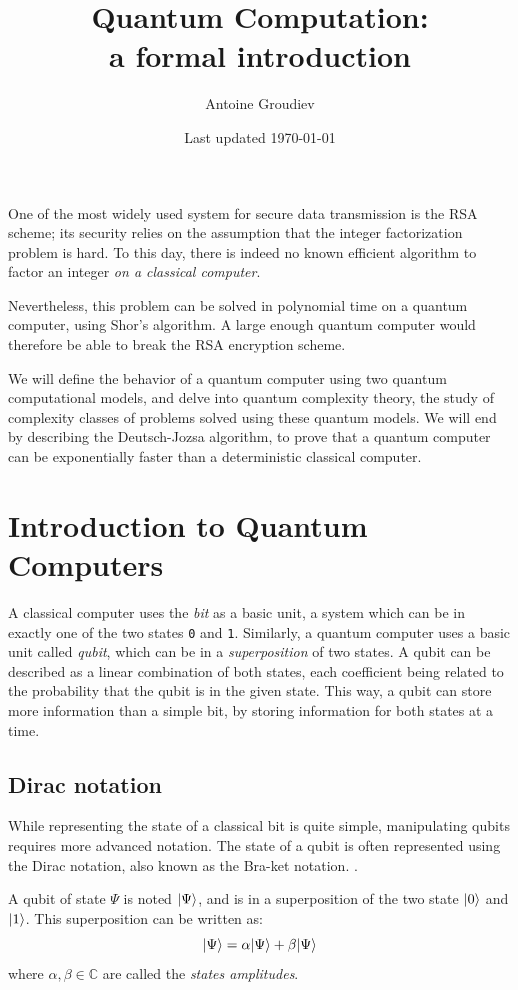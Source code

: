 \documentclass[12pt,a4paper]{article}
\title{\vspace{-5ex} \textbf{Quantum Computation:\\a formal introduction}}
\author{Antoine Groudiev}
\date{\vspace{-1ex}Last updated \today}
\theoremstyle{plain}
\theoremstyle{definition}
\DeclarePairedDelimiter\ket{\lvert}{\rangle}
\begin{document}
\maketitle
One of the most widely used system for secure data transmission is the RSA scheme; its security relies on the assumption that the integer factorization problem is hard. To this day, there is indeed no known efficient algorithm to factor an integer \textit{on a classical computer}.

Nevertheless, this problem can be solved in polynomial time on a quantum computer, using Shor's algorithm. A large enough quantum computer would therefore be able to break the RSA encryption scheme.

We will define the behavior of a quantum computer using two quantum computational models, and delve into quantum complexity theory, the study of complexity classes of problems solved using these quantum models. We will end by describing the Deutsch-Jozsa algorithm, to prove that a quantum computer can be exponentially faster than a deterministic classical computer.

\tableofcontents

\section{Introduction to Quantum Computers}
A classical computer uses the \emph{bit} as a basic unit, a system which can be in exactly one of the two states \texttt{0} and \texttt{1}. Similarly, a quantum computer uses a basic unit called \emph{qubit}, which can be in a \emph{superposition} of two states. A qubit can be described as a linear combination of both states, each coefficient being related to the probability that the qubit is in the given state. This way, a qubit can store more information than a simple bit, by storing information for both states at a time.

\subsection{Dirac notation}
While representing the state of a classical bit is quite simple, manipulating qubits requires more advanced notation. 
The state of a qubit is often represented using the Dirac notation, also known as the Bra-ket notation. \cite{dirac-notation}.

A qubit of state $\Psi$ is noted $\ket{\Psi}$, and is in a superposition of the two state $\ket{0}$ and $\ket{1}$. This superposition can be written as:
\begin{equation*}
    \ket{\Psi}=\alpha\ket{\Psi}+\beta\ket{\Psi}
\end{equation*}
where $\alpha, \beta\in \mathbb{C}$ are called the \emph{states amplitudes}. 
\end{document}
